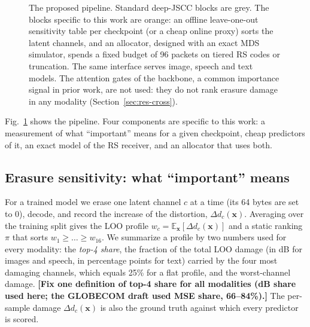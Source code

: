 \documentclass[journal]{IEEEtran}
\providecommand{\TBD}[1]{\textbf{\color{red}[#1]}}
\begin{document}
\begin{figure}[t]
{}
\caption{The proposed pipeline. Standard deep-JSCC blocks are grey. The blocks specific to this work are
orange: an offline leave-one-out sensitivity table per checkpoint (or a cheap online proxy) sorts the
latent channels, and an allocator, designed with an exact MDS simulator, spends a fixed budget of 96
packets on tiered RS codes or truncation. The same interface serves image, speech and text models. The
attention gates of the backbone, a common importance signal in prior work, are not used: they do not rank
erasure damage in any modality (Section~\ref{sec:res-cross}).}
\label{fig:workflow}
\end{figure}

Fig.~\ref{fig:workflow} shows the pipeline. Four components are specific to this work: a measurement of
what ``important'' means for a given checkpoint, cheap predictors of it, an exact model of the RS
receiver, and an allocator that uses both.

\subsection{Erasure sensitivity: what ``important'' means}
For a trained model we erase one latent channel $c$ at a time (its 64 bytes are set to $0$), decode, and
record the increase of the distortion, $\Delta d_c(\mathbf{x})$. Averaging over the training split gives
the LOO profile $w_c=\mathbb{E}_{\mathbf{x}}[\Delta d_c(\mathbf{x})]$ and a static ranking $\pi$ that sorts
$w_1\ge\dots\ge w_{16}$. We summarize a profile by two numbers used for every modality: the \emph{top-4
share}, the fraction of the total LOO damage (in dB for images and speech, in percentage points for
text) carried by the four most damaging channels, which equals 25\% for a flat profile, and the
worst-channel damage. \TBD{Fix one definition of top-4 share for all modalities (dB share used here; the
GLOBECOM draft used MSE share, 66--84\%).} The per-sample damage $\Delta d_c(\mathbf{x})$ is also the
ground truth against which every predictor is scored.
\end{document}
